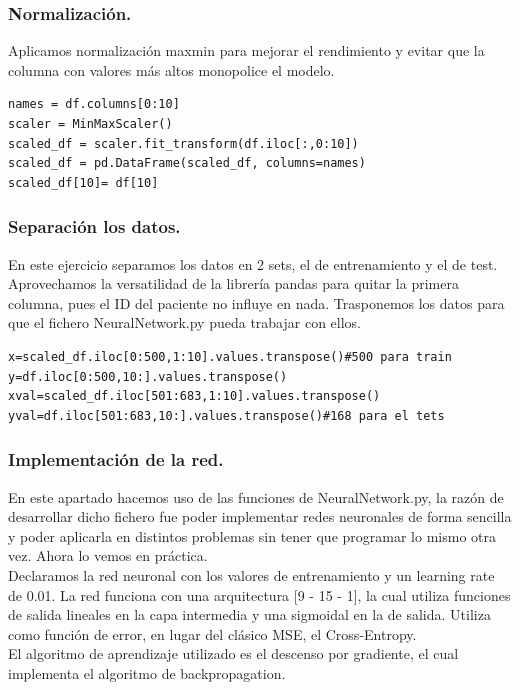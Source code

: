 \documentclass[a4paper,11pt]{article}
\begin{document}
\subsubsection{Normalización.}
Aplicamos normalización maxmin para mejorar el rendimiento y evitar que la columna con valores más altos monopolice el modelo. 
\begin{lstlisting}
names = df.columns[0:10]
scaler = MinMaxScaler() 
scaled_df = scaler.fit_transform(df.iloc[:,0:10]) 
scaled_df = pd.DataFrame(scaled_df, columns=names)
scaled_df[10]= df[10]
\end{lstlisting}
\subsubsection{Separación los datos.}
En este ejercicio separamos los datos en 2 sets, el de entrenamiento y el de test. Aprovechamos la versatilidad de la librería pandas para quitar la primera columna, pues el ID del paciente no influye en nada. Trasponemos los datos para que el fichero NeuralNetwork.py pueda trabajar con ellos.
\begin{lstlisting}
x=scaled_df.iloc[0:500,1:10].values.transpose()#500 para train
y=df.iloc[0:500,10:].values.transpose()
xval=scaled_df.iloc[501:683,1:10].values.transpose()
yval=df.iloc[501:683,10:].values.transpose()#168 para el tets
\end{lstlisting}
\subsubsection{Implementación de la red.}
En este apartado hacemos uso de las funciones de NeuralNetwork.py, la razón de desarrollar dicho fichero fue poder implementar redes neuronales de forma sencilla y poder aplicarla en distintos problemas sin tener que programar lo mismo otra vez. Ahora lo vemos en práctica.\\

\noindent
Declaramos la red neuronal con los valores de entrenamiento y un learning rate de 0.01. La red funciona con una arquitectura [9 - 15 - 1], la cual utiliza funciones de salida lineales en la capa intermedia y una sigmoidal en la de salida. Utiliza como función de error, en lugar del clásico MSE, el Cross-Entropy. \\

\noindent
El algoritmo de aprendizaje utilizado es el descenso por gradiente, el cual implementa el algoritmo de backpropagation.\\
\end{document}
